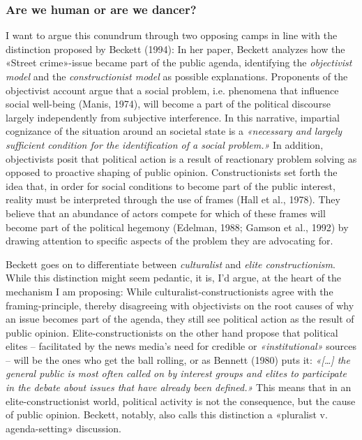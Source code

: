 \documentclass[11pt,a4paper]{article}
\begin{document}
\subsubsection{Are we human or are we dancer?}
I want to argue this conundrum through two opposing camps in line with the distinction proposed by Beckett (1994): In her paper, Beckett analyzes how the «Street crime»-issue became part of the public agenda, identifying the \textit{objectivist model} and the \textit{constructionist model }as possible explanations. Proponents of the objectivist account argue that a social problem, i.e. phenomena that influence social well-being (Manis, 1974), will become a part of the political discourse largely independently from subjective interference. In this narrative, impartial cognizance of the situation around an societal state is a \textit{«necessary and largely sufficient condition for the identification of a social problem.»} In addition, objectivists posit that political action is a result of reactionary problem solving as opposed to proactive shaping of public opinion. Constructionists set forth the idea that, in order for social conditions to become part of the public interest, reality must be interpreted through the use of frames (Hall et al., 1978). They believe that an abundance of actors compete for which of these frames will become part of the political hegemony (Edelman, 1988; Gamson et al., 1992) by drawing attention to specific aspects of the problem they are advocating for. 

Beckett goes on to differentiate between \textit{culturalist} and \textit{elite constructionism}. While this distinction might seem pedantic, it is, I’d argue, at the heart of the mechanism I am proposing: While culturalist-constructionists agree with the framing-principle, thereby disagreeing with objectivists on the root causes of why an issue becomes part of the agenda, they still see political action as the result of public opinion. Elite-constructionists on the other hand propose that political elites – facilitated by the news media’s need for credible or \textit{«institutional»} sources – will be the ones who get the ball rolling, or as Bennett (1980) puts it: \textit{«[…] the general public is most often called on by interest groups and elites to participate in the debate about issues that have already been defined.»} This means that in an elite-constructionist world, political activity is not the consequence, but the cause of public opinion. Beckett, notably, also calls this distinction a «pluralist v. agenda-setting» discussion.
\end{document}
